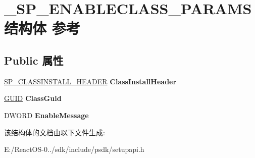 \hypertarget{struct___s_p___e_n_a_b_l_e_c_l_a_s_s___p_a_r_a_m_s}{}\section{\+\_\+\+S\+P\+\_\+\+E\+N\+A\+B\+L\+E\+C\+L\+A\+S\+S\+\_\+\+P\+A\+R\+A\+M\+S结构体 参考}
\label{struct___s_p___e_n_a_b_l_e_c_l_a_s_s___p_a_r_a_m_s}
\subsection*{Public 属性}
\begin{DoxyCompactItemize}
\item 
\mbox{\label{struct___s_p___e_n_a_b_l_e_c_l_a_s_s___p_a_r_a_m_s_a882148449274a209c9ed9e3b43b11a8b}} 
\hyperlink{struct___s_p___c_l_a_s_s_i_n_s_t_a_l_l___h_e_a_d_e_r}{S\+P\+\_\+\+C\+L\+A\+S\+S\+I\+N\+S\+T\+A\+L\+L\+\_\+\+H\+E\+A\+D\+ER} {\bfseries Class\+Install\+Header}
\item 
\mbox{\label{struct___s_p___e_n_a_b_l_e_c_l_a_s_s___p_a_r_a_m_s_a29ccd97c604592185ef3ce99cd60bbfd}} 
\hyperlink{interface_g_u_i_d}{G\+U\+ID} {\bfseries Class\+Guid}
\item 
\mbox{\label{struct___s_p___e_n_a_b_l_e_c_l_a_s_s___p_a_r_a_m_s_a5216678781d6973c5fc3ddf533d2c42f}} 
D\+W\+O\+RD {\bfseries Enable\+Message}
\end{DoxyCompactItemize}


该结构体的文档由以下文件生成\+:\begin{DoxyCompactItemize}
\item 
E\+:/\+React\+O\+S-\/0../sdk/include/psdk/setupapi.\+h\end{DoxyCompactItemize}
